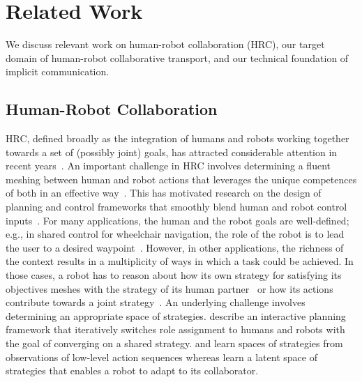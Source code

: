\section{Related Work}\label{sec:related-work}

We discuss relevant work on human-robot collaboration (HRC), our target domain of human-robot collaborative transport, and our technical foundation of implicit communication.


\subsection{Human-Robot Collaboration}

HRC, defined broadly as the integration of humans and robots working together towards a set of (possibly joint) goals, has attracted considerable attention in recent years~\citep{mainprice2013collaborative,Wilcox-RSS-12,gopinath2017sharedautonomy,carlson2013wheelchair-shared}. An important challenge in HRC involves determining a fluent meshing between human and robot actions that leverages the unique competences of both in an effective way~\citep{hoffman2019evaluating}. This has motivated research on the design of planning and control frameworks that smoothly blend human and robot control inputs~\citep{dragan2013blending,nikolaidis2017adaptation,unhelkar2020bidirectional,aronson2024intentional}. For many applications, the human and the robot goals are well-defined; e.g., in shared control for wheelchair navigation, the role of the robot is to lead the user to a desired waypoint~\citep{carlson2013wheelchair-shared}. However, in other applications, the richness of the context results in a multiplicity of ways in which a task could be achieved. In those cases, a robot has to reason about how its own strategy for satisfying its objectives meshes with the strategy of its human partner~\citep{zhao2022coordination,pandya2024multi,peters2020inference,wang2022co} or how its actions contribute towards a joint strategy~\citep{xie2021learning}. An underlying challenge involves determining an appropriate space of strategies. \citet{nikolaidis2013human} describe an interactive planning framework that iteratively switches role assignment to humans and robots with the goal of converging on a shared strategy. \citet{zhao2022coordination} and \citet{xie2021learning} learn spaces of strategies from observations of low-level action sequences whereas \citet{wang2022co} learn a latent space of strategies that enables a robot to adapt to its collaborator.

